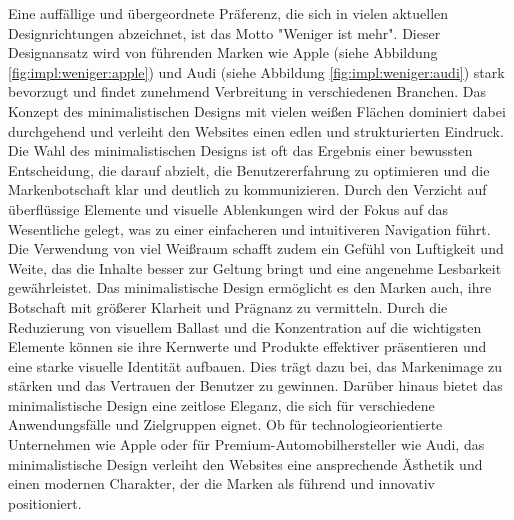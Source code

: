 Eine auffällige und übergeordnete Präferenz, die sich in vielen aktuellen Designrichtungen abzeichnet, 
ist das Motto "Weniger ist mehr". Dieser Designansatz wird von führenden Marken wie Apple (siehe Abbildung \ref{fig:impl:weniger:apple}) 
und Audi (siehe Abbildung \ref{fig:impl:weniger:audi}) stark bevorzugt und findet zunehmend Verbreitung in verschiedenen Branchen. 
Das Konzept des minimalistischen Designs mit vielen weißen Flächen dominiert dabei durchgehend und verleiht den Websites einen edlen 
und strukturierten Eindruck.
Die Wahl des minimalistischen Designs ist oft das Ergebnis einer bewussten Entscheidung, die darauf abzielt, die Benutzererfahrung 
zu optimieren und die Markenbotschaft klar und deutlich zu kommunizieren. Durch den Verzicht auf überflüssige Elemente und visuelle 
Ablenkungen wird der Fokus auf das Wesentliche gelegt, was zu einer einfacheren und intuitiveren Navigation führt. Die Verwendung 
von viel Weißraum schafft zudem ein Gefühl von Luftigkeit und Weite, das die Inhalte besser zur Geltung bringt und eine angenehme 
Lesbarkeit gewährleistet.
Das minimalistische Design ermöglicht es den Marken auch, ihre Botschaft mit größerer Klarheit und Prägnanz zu vermitteln. Durch 
die Reduzierung von visuellem Ballast und die Konzentration auf die wichtigsten Elemente können sie ihre Kernwerte und Produkte 
effektiver präsentieren und eine starke visuelle Identität aufbauen. Dies trägt dazu bei, das Markenimage zu stärken und das Vertrauen 
der Benutzer zu gewinnen.
Darüber hinaus bietet das minimalistische Design eine zeitlose Eleganz, die sich für verschiedene Anwendungsfälle und Zielgruppen eignet. 
Ob für technologieorientierte Unternehmen wie Apple oder für Premium-Automobilhersteller wie Audi, das minimalistische Design verleiht 
den Websites eine ansprechende Ästhetik und einen modernen Charakter, der die Marken als führend und innovativ positioniert.

